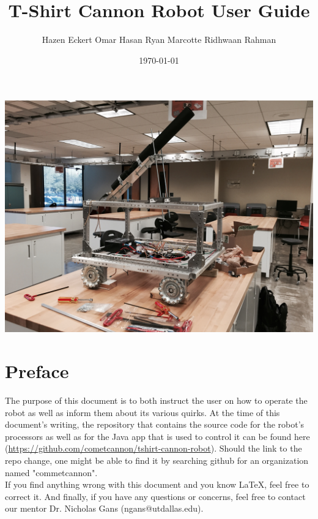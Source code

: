 \documentclass[letterpaper,12pt]{article}
\begin{document}
\title{\textbf{T-Shirt Cannon Robot User Guide}}
\author{Hazen Eckert \hspace{3mm} Omar Hasan \hspace{3mm} Ryan Marcotte \hspace{3mm} Ridhwaan Rahman}
\date{\today}
\maketitle

\begin{center}
    \includegraphics[width=15cm]{./pics/chassis/robot.jpg}
\end{center}

\pagebreak

\section*{Preface}
The purpose of this document is to both instruct the user on how to operate the
robot as well as inform them about its various quirks. At the time of this
document's writing, the repository that contains the source code for the
robot's processors as well as for the Java app that is used to control it
can be found here (\url{https://github.com/cometcannon/tshirt-cannon-robot}).
Should the link to the repo change, one might be able to find it by searching
github for an organization named "commetcannon".\\

If you find anything wrong with this document and you know LaTeX, feel free to
correct it. And finally, if you have any questions or concerns, feel free to
contact our mentor Dr. Nicholas Gans (ngans@utdallas.edu).\\
\end{document}
